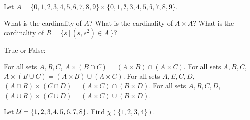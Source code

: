 \begin{prob}
Let $A=\{0,1,2,3,4,5,6,7,8,9\}\times\{0,1,2,3,4,5,6,7,8,9\}$. 
  \begin{tasks}
      \task What is the cardinality of $A$? 
      \task What is the cardinality of $A\times A$?
      \task What is the cardinality of $B= \{ s\,|\, (s,s^2)\in A\,\}$?
  \end{tasks}     
\end{prob}

\begin{prob}
True or False:
   \begin{tasks}
      \task For all sets $A,B,C$, $A\times(B\cap C) = (A\times B)\cap(A\times C)$.
      \task For all sets $A,B,C$, $A\times(B\cup C) = (A\times B)\cup(A\times C)$.
      \task For all sets $A,B,C,D$, $(A\cap B)\times(C\cap D) = (A\times C)\cap(B\times D)$.
      \task For all sets $A,B,C,D$, $(A\cup B)\times(C\cup D) = (A\times C)\cup(B\times D)$.
    \end{tasks}
\end{prob}

\begin{prob}
Let ${\cal {U}} = \{ 1, 2, 3, 4, 5, 6, 7, 8\}$.  Find $\chi(\{1, 2, 3, 4\})$.
\end{prob}

 

